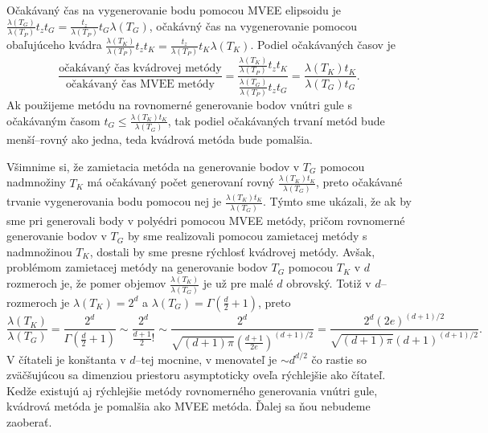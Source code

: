 Očakávaný čas na vygenerovanie bodu pomocou MVEE elipsoidu je $\frac{\lambda(T_G)}{\lambda(T_P)}t_zt_G=\frac{t_z}{\lambda(T_P)}t_G\lambda(T_G)$, očakávný čas na vygenerovanie pomocou obaľujúceho kvádra $\frac{\lambda(T_K)}{\lambda(T_P)}t_zt_K=\frac{t_z}{\lambda(T_P)}t_K\lambda(T_K)$.
Podiel očakávaných časov je $$\frac{\text{očakávaný čas kvádrovej metódy}}{\text{očakávaný čas MVEE metódy}}=\frac{\frac{\lambda(T_K)}{\lambda(T_P)}t_zt_K}{\frac{\lambda(T_G)}{\lambda(T_P)}t_zt_G}=\frac{\lambda(T_K)t_K}{\lambda(T_G)t_G}.$$ Ak použijeme metódu na rovnomerné generovanie bodov vnútri gule s očakávaným časom $t_G \le \frac{\lambda(T_K)t_K}{\lambda(T_G)}$, tak podiel očakávaných trvaní metód bude menší--rovný ako jedna, teda kvádrová metóda bude pomalšia.

Všimnime si, že zamietacia metóda na generovanie bodov v $T_G$ pomocou nadmnožiny $T_K$ má očakávaný počet generovaní rovný $\frac{\lambda(T_K)t_K}{\lambda(T_G)}$, preto očakávané trvanie vygenerovania bodu pomocou nej je $\frac{\lambda(T_K)t_K}{\lambda(T_G)}$.
Týmto sme ukázali, že ak by sme pri generovali body v polyédri pomocou MVEE metódy, pričom rovnomerné generovanie bodov v $T_G$ by sme realizovali pomocou zamietacej metódy s nadmnožinou $T_K$, dostali by sme presne rýchlosť kvádrovej metódy. Avšak, problémom zamietacej metódy na generovanie bodov $T_G$ pomocou $T_K$ v $d$ rozmeroch je, že pomer objemov $\frac{\lambda(T_K)}{\lambda(T_G)}$ je už pre malé $d$ obrovský. Totiž v $d$--rozmeroch je $\lambda(T_K)=2^d$ a $\lambda(T_G)=\Gamma(\frac d 2 + 1)$, preto 
$$\frac{\lambda(T_K)}{\lambda(T_G)}=\frac{2^d}{\Gamma(\frac d 2 + 1)} \sim \frac{2^d}{\frac{d+1}{2}!}\sim \frac{2^{d}}{\sqrt{(d+1)\pi}(\frac{d+1}{2e})^{(d+1)/2}}=\frac{2^d (2e)^{(d+1)/2}}{\sqrt{(d+1)\pi}(d+1)^{(d+1)/2}}.$$
V čítateli je konštanta v $d$--tej mocnine, v menovateľ je $\sim d^{d/2}$ čo rastie so zväčšujúcou sa dimenziou priestoru asymptoticky oveľa rýchlejšie ako čítateľ.
Kedže existujú aj rýchlejšie metódy rovnomerného generovania vnútri gule, kvádrová metóda je pomalšia ako MVEE metóda. Ďalej sa ňou nebudeme zaoberať.\\
